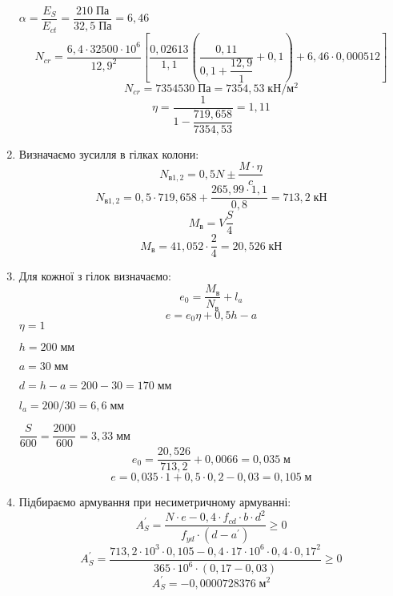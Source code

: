 \documentclass[a4paper,14pt]{article}
\begin{document}
\begin{enumerate}
        $\alpha = \dfrac{E_S}{E_{ct}} = \dfrac{210\;\textit{Па}}{32,5\;\textit{Па}} = 6,46$
        $$N_{cr} = \dfrac{6,4 \cdot 32500 \cdot 10^6}{12,9^2} \left[\dfrac{0,02613}{1,1} \left(\dfrac{0,11}{0,1 + \dfrac{12,9}{1}} + 0,1\right) + 6,46 \cdot 0,000512\right]$$
        $$N_{cr} = 7354530\;\textit{Па} = 7354,53\;\textit{кН}/\textit{м}^2$$
        $$\eta = \dfrac{1}{1 - \dfrac{719,658}{7354,53}} = 1,11$$
    \item Визначаємо зусилля в гілках колони:
        \begin{equation}
            N_{\textit{в}1,2} = 0,5N \pm \dfrac{M \cdot \eta}{c}
        \end{equation}
        $$N_{\textit{в}1,2} = 0,5\cdot 719,658 + \dfrac{265,99 \cdot 1,1}{0,8} = 713,2\;\textit{кН}$$
        \begin{equation}
            M_\textit{в} = V \dfrac{S}{4}
        \end{equation}
        $$M_\textit{в} = 41,052 \cdot \dfrac{2}{4} = 20,526\;\textit{кН}$$
    \item Для кожної з гілок визначаємо:
        \begin{equation}
            e_0 = \dfrac{M_\textit{в}}{N_\textit{в}} + l_a
        \end{equation}
        \begin{equation}
            e = e_0\eta +  0,5h - a
        \end{equation}
        $\eta = 1$

        $h = 200\;\textit{мм}$

        $a = 30\;\textit{мм}$

        $d = h - a = 200 - 30 = 170\;\textit{мм}$

        $l_a = 200 / 30 = 6,6\;\textit{мм}$

        $\dfrac{S}{600} = \dfrac{2000}{600} = 3,33\;\textit{мм}$
        $$e_0 = \dfrac{20,526}{713,2} + 0,0066 = 0,035\;\textit{м}$$
        $$e = 0,035 \cdot 1 +  0,5 \cdot 0,2 - 0,03 = 0,105\;\textit{м}$$
    \item Підбираємо армування при несиметричному армуванні:
        \begin{equation}
            A_S^\prime = \dfrac{N \cdot e - 0,4 \cdot f_{cd} \cdot b \cdot d^2}{f_{yd} \cdot (d - a^\prime)} \geqslant 0
        \end{equation}
        $$A_S^\prime = \dfrac{713,2 \cdot 10^3 \cdot 0,105 - 0,4 \cdot 17 \cdot 10^6 \cdot 0,4 \cdot 0,17^2}{365 \cdot 10^6 \cdot (0,17 - 0,03)} \geqslant 0$$
        $$A_S^\prime = -0,0000728376\;\textit{м}^2$$


\end{enumerate}
\end{document}
